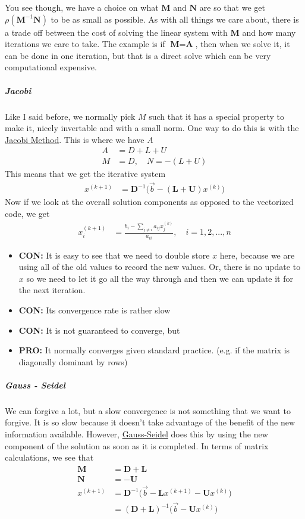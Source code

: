 \documentclass[a4paper,12pt]{article} %
\begin{document}
You see though, we have a choice on what $\textbf{M}$ and $\textbf{N}$ are so that we get $\rho(\textbf{M}^{-1}\textbf{N})$ to be as small as possible. As with all things we care about, there is a trade off between the cost of solving the linear system with $\textbf{M}$ and how many iterations we care to take. The example is if $\textbf{M} = \textbf{A}$, then when we solve it, it can be done in one iteration, but that is a direct solve which can be very computational expensive.
\subparagraph{Jacobi}
Like I said before, we normally pick $M$ such that it has a special property to make it, nicely invertable and with a small norm. One way to do this is with the \underline{Jacobi Method}. This is where we have $A$
\begin{align}
	A &= D + L + U\\
	M &= D, \quad N = -(L + U)
\end{align}
This means that we get the iterative system
\begin{align}
	x^{(k+1)} &= \textbf{D}^{-1}\big( \vec{b} - (\textbf{L}+\textbf{U})x^{(k)}\big)
\end{align}
Now if we look at the overall solution components as opposed to the vectorized code, we get
\begin{align}
	x_i^{(k+1)} &= \frac{b_i - \sum_{j\neq i} a_{ij}x_j^{(k)}}{a_{ii}}, \quad i = 1,2,...,n
\end{align}
	\begin{itemize}
		\item \textbf{CON:} It is easy to see that we need to double store $x$ here, because we are using all of the old values to record the new values. Or, there is no update to $x$ so we need to let it go all the way through and then we can update it for the next iteration.
		\item \textbf{CON:} Its convergence rate is rather slow 
		\item \textbf{CON:} It is not guaranteed to converge, but
		\item \textbf{PRO:} It normally converges given standard practice. (e.g. if the matrix is diagonally dominant by rows)
	\end{itemize}
\subparagraph{Gauss - Seidel}
We can forgive a lot, but a slow convergence is not something that we want to forgive. It is so slow because it doesn't take advantage of the benefit of the new information available. However, \underline{Gauss-Seidel} does this by using the new component of the solution as soon as it is completed.
In terms of matrix calculations, we see that 
\begin{align}
	\textbf{M} &= \textbf{D} + \textbf{L}\\
	\textbf{N} &= -\textbf{U}\\
	x^{(k+1)} &= \textbf{D}^{-1}\big( \vec{b} - \textbf{L}x^{(k+1)} - \textbf{U}x^{(k)}\big)\\
	&= (\textbf{D} + \textbf{L})^{-1} \big( \vec{b} - \textbf{U}x^{(k)}\big)
\end{align}
\end{document}
